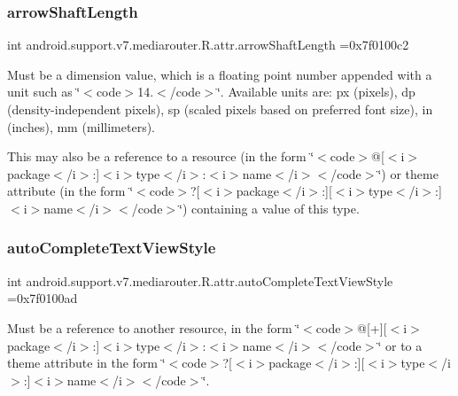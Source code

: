 \subsubsection{\texorpdfstring{arrow\+Shaft\+Length}{arrowShaftLength}}
{\footnotesize\ttfamily int android.\+support.\+v7.\+mediarouter.\+R.\+attr.\+arrow\+Shaft\+Length =0x7f0100c2\hspace{0.3cm}{\ttfamily [static]}}

Must be a dimension value, which is a floating point number appended with a unit such as \char`\"{}$<$code$>$14.\+5sp$<$/code$>$\char`\"{}. Available units are\+: px (pixels), dp (density-\/independent pixels), sp (scaled pixels based on preferred font size), in (inches), mm (millimeters). 

This may also be a reference to a resource (in the form \char`\"{}$<$code$>$@\mbox{[}$<$i$>$package$<$/i$>$\+:\mbox{]}$<$i$>$type$<$/i$>$\+:$<$i$>$name$<$/i$>$$<$/code$>$\char`\"{}) or theme attribute (in the form \char`\"{}$<$code$>$?\mbox{[}$<$i$>$package$<$/i$>$\+:\mbox{]}\mbox{[}$<$i$>$type$<$/i$>$\+:\mbox{]}$<$i$>$name$<$/i$>$$<$/code$>$\char`\"{}) containing a value of this type. \mbox{\label{classandroid_1_1support_1_1v7_1_1mediarouter_1_1R_1_1attr_a9e541f92dd093ea02358cbc714efa131}} 
\subsubsection{\texorpdfstring{auto\+Complete\+Text\+View\+Style}{autoCompleteTextViewStyle}}
{\footnotesize\ttfamily int android.\+support.\+v7.\+mediarouter.\+R.\+attr.\+auto\+Complete\+Text\+View\+Style =0x7f0100ad\hspace{0.3cm}{\ttfamily [static]}}

Must be a reference to another resource, in the form \char`\"{}$<$code$>$@\mbox{[}+\mbox{]}\mbox{[}$<$i$>$package$<$/i$>$\+:\mbox{]}$<$i$>$type$<$/i$>$\+:$<$i$>$name$<$/i$>$$<$/code$>$\char`\"{} or to a theme attribute in the form \char`\"{}$<$code$>$?\mbox{[}$<$i$>$package$<$/i$>$\+:\mbox{]}\mbox{[}$<$i$>$type$<$/i$>$\+:\mbox{]}$<$i$>$name$<$/i$>$$<$/code$>$\char`\"{}. \mbox{\label{classandroid_1_1support_1_1v7_1_1mediarouter_1_1R_1_1attr_a3bafd93ea64f8ac92ba9d29c95112cea}} 
